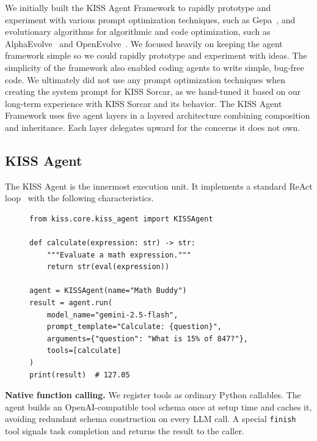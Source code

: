 \documentclass{article}
\begin{document}
We initially built the KISS Agent Framework to rapidly prototype and experiment with various prompt optimization techniques, such as Gepa~\citep{agrawal2025gepa}, and evolutionary algorithms for algorithmic and code optimization, such as AlphaEvolve~\citep{novikov2025alphaevolve} and OpenEvolve~\citep{openevolve2025}. We focused heavily on keeping the agent framework simple so we could rapidly prototype and experiment with ideas.  The simplicity of the framework also enabled coding agents to write simple, bug-free code.  We ultimately did not use any prompt optimization techniques when creating the system prompt for KISS Sorcar, as we hand-tuned it based on our long-term experience with KISS Sorcar and its behavior.  The KISS Agent Framework uses five agent layers in a layered architecture combining composition and inheritance. Each layer delegates upward for the concerns it does not own.

\subsection{KISS Agent}
\label{sec:kiss-agent}

The KISS Agent is the innermost execution unit.  It implements a standard ReAct loop~\citep{yao2023react} with the following characteristics.  

\begin{figure}[H]
\begin{lstlisting}[style=kisspy,numbers=none,caption={A complete KISS agent with a single tool.},label={lst:simple-agent}]
from kiss.core.kiss_agent import KISSAgent

def calculate(expression: str) -> str:
    """Evaluate a math expression."""
    return str(eval(expression))

agent = KISSAgent(name="Math Buddy")
result = agent.run(
    model_name="gemini-2.5-flash",
    prompt_template="Calculate: {question}",
    arguments={"question": "What is 15% of 847?"},
    tools=[calculate]
)
print(result)  # 127.05
\end{lstlisting}
\end{figure}

\textbf{Native function calling.}  We register tools as ordinary Python callables.  The agent builds an OpenAI-compatible tool schema once at setup time and caches it, avoiding redundant schema construction on every LLM call.  A special \texttt{finish} tool signals task completion and returns the result to the caller.
\end{document}
